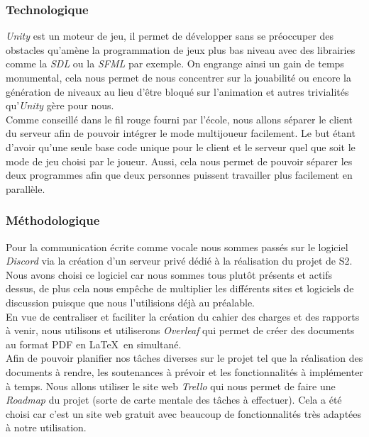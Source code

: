 \documentclass{article}
\begin{document}
\pagebreak

\subsubsection{Technologique}


\textit{Unity} est un moteur de jeu, il permet de développer sans se préoccuper des obstacles qu'amène la programmation de jeux plus bas niveau avec des librairies comme la \textit{SDL} ou la \textit{SFML} par exemple. On engrange ainsi un gain de temps monumental, cela nous permet de nous concentrer sur la jouabilité ou encore la génération de niveaux au lieu d'être bloqué sur l'animation et autres trivialités qu'\textit{Unity} gère pour nous. \\

Comme conseillé dans le fil rouge fourni par l'école, nous allons séparer le client du serveur afin de pouvoir intégrer le mode multijoueur facilement. Le but étant d'avoir qu'une seule base code unique pour le client et le serveur quel que soit le mode de jeu choisi par le joueur. Aussi, cela nous permet de pouvoir séparer les deux programmes afin que deux personnes puissent travailler plus facilement en parallèle.

\subsubsection{Méthodologique}


Pour la communication écrite comme vocale nous sommes passés sur le logiciel \textit{Discord} via la création d'un serveur privé dédié à la réalisation du projet de S2. Nous avons choisi ce logiciel car nous sommes tous plutôt présents et actifs dessus, de plus cela nous empêche de multiplier les différents sites et logiciels de discussion puisque que nous l'utilisions déjà au préalable. \\

En vue de centraliser et faciliter la création du cahier des charges et des rapports à venir, nous utilisons et utiliserons \textit{Overleaf} qui permet de créer des documents au format PDF en \LaTeX \ en simultané. \\

Afin de pouvoir planifier nos tâches diverses sur le projet tel que la réalisation des documents à rendre, les soutenances à prévoir et les fonctionnalités à implémenter à temps. Nous allons utiliser le site web \textit{Trello} qui nous permet de faire une \textit{Roadmap} du projet (sorte de carte mentale des tâches à effectuer). Cela a été choisi car c'est un site web gratuit avec beaucoup de fonctionnalités très adaptées à notre utilisation. \\
\end{document}
